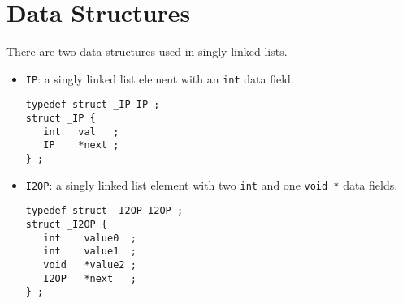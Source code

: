 \par
\section{Data Structures}
\label{section:Utilities:dataStructure}
\par
There are two data structures used in singly linked lists.
\begin{itemize}
\item
{\tt IP}: a singly linked list element with an {\tt int} data field.
\par
\hspace{0.5 in}
\begin{minipage}{2.5 in}
\begin{verbatim}
typedef struct _IP IP ;
struct _IP {
   int   val   ;
   IP    *next ;
} ;
\end{verbatim}
\end{minipage}
\item
{\tt I2OP}: 
a singly linked list element with two {\tt int} 
and one {\tt void *} data fields.
\par
\hspace{0.5 in}
\begin{minipage}{2.5 in}
\begin{verbatim}
typedef struct _I2OP I2OP ;
struct _I2OP {
   int    value0  ;
   int    value1  ;
   void   *value2 ;
   I2OP   *next   ;
} ;
\end{verbatim}
\end{minipage}
\end{itemize}
